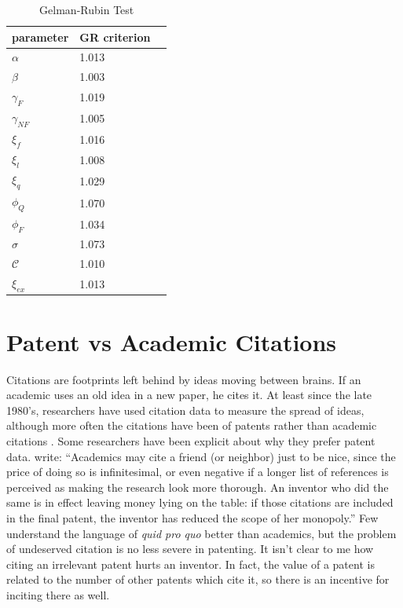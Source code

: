 \begin{table}[!ht]
    \centering
    \begin{tabular}{lll}
        \hline
        parameter       & GR criterion \\ \hline \hline
        $\alpha$        & 1.013  \\
        $\beta$         & 1.003  \\
        $\gamma_{F}$    & 1.019  \\
        $\gamma_{NF}$   & 1.005  \\
        $\xi_f$         & 1.016  \\
        $\xi_l$         & 1.008  \\
        $\xi_q$         & 1.029  \\
        $\phi_Q$        & 1.070  \\
        $\phi_F$        & 1.034  \\
        $\sigma$        & 1.073  \\
        $\mathcal{C}$   & 1.010  \\
        $\xi_{ex}$      & 1.013  \\ \hline
    \end{tabular}
    \caption{Gelman-Rubin Test}
    \label{tab:grtest}
\end{table}

\clearpage
\section{Patent vs Academic Citations}

Citations are footprints left behind by ideas moving between brains. If
an academic uses an old idea in a new paper, he cites it. At least since
the late 1980's, researchers have used citation data to measure the
spread of ideas, although more often the citations have been of patents
rather than academic citations \citep{griliches1998patent}. Some
researchers have been explicit about why they prefer patent data.
\citep{jaffe2002patents} write: ``Academics may cite a friend (or
neighbor) just to be nice, since the price of doing so is infinitesimal,
or even negative if a longer list of references is perceived as making
the research look more thorough. An inventor who did the same is in
effect leaving money lying on the table: if those citations are included
in the final patent, the inventor has reduced the scope of her
monopoly.'' Few understand the language of \emph{quid pro quo} better
than academics, but the problem of undeserved citation is no less severe
in patenting. It isn't clear to me how citing an irrelevant patent hurts
an inventor. In fact, the value of a patent is related to the number of
other patents which cite it, so there is an incentive for inciting there
as well.

